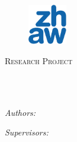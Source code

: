 \documentclass[
11pt, %
english, %
singlespacing, %
headsepline, %
]{MastersDoctoralThesis} %
\author{Ricardo Daniel \textsc{Monteiro Simões},  Patrick \textsc{Huber}}
\begin{document}
\frontmatter %

\pagestyle{plain} %


\begin{titlepage}
\begin{center}

\begin{figure}
\centering
\includegraphics[width=0.15\textwidth]{Figures/ZHAW_Logo.png} %
\end{figure}

\vspace*{.06\textheight}
{\scshape\LARGE \univname\par}\vspace{1.5cm} %
\textsc{\Large Research Project}\\[0.5cm] %

\HRule \\[0.4cm] %
{\huge \bfseries \ttitle\par}\vspace{0.4cm} %
\HRule \\[1.5cm] %
 
\begin{minipage}[t]{0.4\textwidth}
\begin{flushleft} \large
\emph{Authors:}\\
\authorname %
\end{flushleft}
\end{minipage}
\begin{minipage}[t]{0.4\textwidth}
\begin{flushright} \large
\emph{Supervisors:} \\
\supname %
\end{flushright}
\end{minipage}\\[3cm]
 

\end{center}
\end{titlepage}
\end{document}
